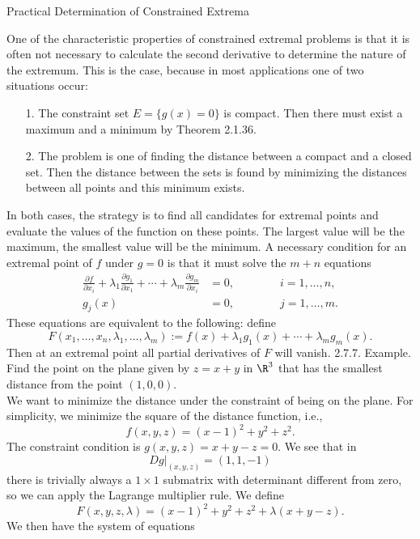 \documentclass[smaller,hyperref={CJKbookmarks=true}]{beamer}
\begin{document}
\begin{frame}{Practical Determination of Constrained Extrema}
\begin{spacing}{1.1}
One of the characteristic properties of constrained extremal problems is
that it is often not necessary to calculate the second derivative to
determine the nature of the extremum. This is the case, because in most
applications one of two situations occur:
\begin{itemize}
  \item[1.] The constraint set $E=\{g(x)=0\}$ is compact. Then there must exist a maximum and a minimum by Theorem 2.1.36.
  \item[2.] The problem is one of finding the distance between a compact and a
closed set. Then the distance between the sets is found by minimizing
the distances between all points and this minimum exists.
\end{itemize}
In both cases, the strategy is to find all candidates for extremal points and
evaluate the values of the function on these points. The largest value will
be the maximum, the smallest value will be the minimum.
\newpage
A necessary condition for an extremal point of $f$ under $g = 0$ is that it
must solve the $m + n$ equations
\begin{align*}
  \frac{\partial f}{\partial x_i}+\lambda_1\frac{\partial g_1}{\partial x_1}+\cdots+\lambda_m\frac{\partial g_m}{\partial x_i} &=0,\qquad\qquad i=1,\ldots,n, \\
  g_j(x) &=0,\qquad\qquad j=1,\ldots,m.
\end{align*}
These equations are equivalent to the following: define
\[F(x_1,\ldots,x_n,\lambda_1,\ldots,\lambda_m)
:=f(x)+\lambda_1g_1(x)+\cdots+\lambda_mg_m(x).\]
Then at an extremal point all partial derivatives of $F$ will vanish.
\newpage
\alert{2.7.7. Example.} Find the point on the plane given by $z=x+y$ in $\R^3$ that has the smallest distance from the point $(1,0,0)$.\\[5pt]
We want to minimize the distance under the constraint of being on the
plane. For simplicity, we minimize the square of the distance function, i.e.,
\[f(x,y,z)=(x-1)^2+y^2+z^2.\]
The constraint condition is $g(x,y,z)=x+y-z=0$. We see that in
\[Dg|_{(x,y,z)}=(1,1,-1)\]
there is trivially always a $1\times 1$ submatrix with determinant dif{}ferent from
zero, so we can apply the Lagrange multiplier rule. We define
\[F(x,y,z,\lambda)=(x-1)^2+y^2+z^2+\lambda(x+y-z).\]
\newpage
We then have the system of equations
\begin{align*}

\end{align*}
\end{spacing}
\end{frame}
\end{document}
